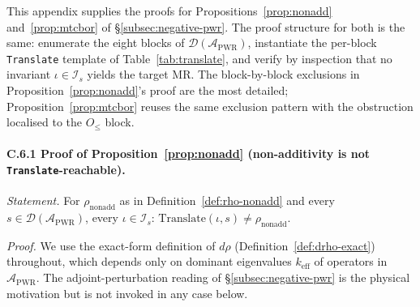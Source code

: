 \documentclass[acmsmall, screen]{acmart}
\begin{document}
This appendix supplies the proofs for Propositions~\ref{prop:nonadd} and~\ref{prop:mtcbor} of \S\ref{subsec:negative-pwr}. The proof structure for both is the same: enumerate the eight blocks of $\mathcal{D}(\mathcal{A}_{\mathrm{PWR}})$, instantiate the per-block \texttt{Translate} template of Table~\ref{tab:translate}, and verify by inspection that no invariant $\iota \in \mathcal{I}_{s}$ yields the target MR. The block-by-block exclusions in Proposition~\ref{prop:nonadd}'s proof are the most detailed; Proposition~\ref{prop:mtcbor} reuses the same exclusion pattern with the obstruction localised to the $O_{\le}$ block.

\paragraph{C.6.1 Proof of Proposition~\ref{prop:nonadd} (non-additivity is not \texttt{Translate}-reachable).}

\emph{Statement.} For $\rho_{\mathrm{nonadd}}$ as in Definition~\ref{def:rho-nonadd} and every $s \in \mathcal{D}(\mathcal{A}_{\mathrm{PWR}})$, every $\iota \in \mathcal{I}_{s}$: $\mathrm{Translate}(\iota, s) \neq \rho_{\mathrm{nonadd}}$.

\emph{Proof.} We use the exact-form definition of $d\rho$ (Definition~\ref{def:drho-exact}) throughout, which depends only on dominant eigenvalues $k_{\mathrm{eff}}$ of operators in $\mathcal{A}_{\mathrm{PWR}}$. The adjoint-perturbation reading of \S\ref{subsec:negative-pwr} is the physical motivation but is not invoked in any case below.
\end{document}
